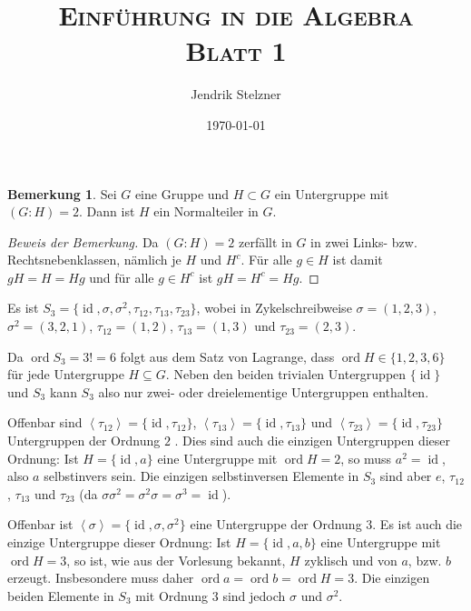 \documentclass[a4paper,10pt]{article}
\title{\textsc{Einführung in die Algebra \\ \Large Blatt 1}}
\author{Jendrik Stelzner}
\date{\today}
\theoremstyle{definition}
\newtheorem*{bem}{Bemerkung}
\newcommand{\id}{\operatorname{id}}
\newcommand{\ord}{\operatorname{ord}}
\newcommand{\gen}[1]{\left\langle#1\right\rangle}
\begin{document}
\maketitle





\section{}

\begin{bem}
 Sei $G$ eine Gruppe und $H \subset G$ ein Untergruppe mit $(G : H) = 2$. Dann ist $H$ ein Normalteiler in $G$.
\end{bem}
\begin{proof}[Beweis der Bemerkung]
 Da $(G : H) = 2$ zerfällt in $G$ in zwei Links- bzw. Rechtsnebenklassen, nämlich je $H$ und $H^c$. Für alle $g \in H$ ist damit $gH = H = Hg$ und für alle $g \in H^c$ ist $gH = H^c = Hg$.
\end{proof}

Es ist $S_3 = \{\id, \sigma, \sigma^2, \tau_{12}, \tau_{13}, \tau_{23} \}$, wobei in Zykelschreibweise $\sigma = (1,2,3)$, $\sigma^2 = (3,2,1)$, $\tau_{12} = (1,2)$, $\tau_{13} = (1,3)$ und $\tau_{23} = (2,3)$.

Da $\ord S_3 = 3! = 6$ folgt aus dem Satz von Lagrange, dass $\ord H \in \{1,2,3,6\}$ für jede Untergruppe $H \subseteq G$. Neben den beiden trivialen Untergruppen $\{\id\}$ und $S_3$ kann $S_3$ also nur zwei- oder dreielementige Untergruppen enthalten.

Offenbar sind $\gen{\tau_{12}} = \{\id,\tau_{12}\}$, $\gen{\tau_{13}} = \{\id, \tau_{13}\}$ und $\gen{\tau_{23}} = \{\id, \tau_{23}\}$ Untergruppen der Ordnung $2$ . Dies sind auch die einzigen Untergruppen dieser Ordnung: Ist $H = \{\id, a\}$ eine Untergruppe mit $\ord H = 2$, so muss $a^2 = \id$, also $a$ selbstinvers sein. Die einzigen selbstinversen Elemente in $S_3$ sind aber $e$, $\tau_{12}$, $\tau_{13}$ und $\tau_{23}$ (da $\sigma \sigma^2 = \sigma^2 \sigma = \sigma^3 = \id$).

Offenbar ist $\gen{\sigma} = \{\id, \sigma, \sigma^2\}$ eine Untergruppe der Ordnung $3$. Es ist auch die einzige Untergruppe dieser Ordnung: Ist $H = \{\id, a, b\}$ eine Untergruppe mit $\ord H = 3$, so ist, wie aus der Vorlesung bekannt, $H$ zyklisch und von $a$, bzw. $b$ erzeugt. Insbesondere muss daher $\ord a = \ord b = \ord H = 3$. Die einzigen beiden Elemente in $S_3$ mit Ordnung $3$ sind jedoch $\sigma$ und $\sigma^2$.
\end{document}

